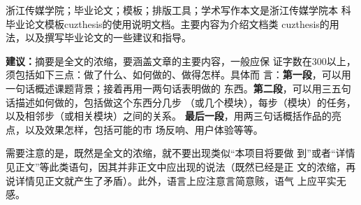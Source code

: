 
\begin{chineseabstract}
	{浙江传媒学院；毕业论文；模板；排版工具；学术写作}本文是浙江传媒学院本
	科毕业论文模板cuzthesis的使用说明文档。主要内容为介绍文档类
	cuzthesis的用法，以及撰写毕业论文的一些建议和指导。

	\begin{leftbar}
		\noindent\textbf{建议：}摘要是全文的浓缩，要涵盖文章的主要内容，一般应保
		证字数在300以上，须包括如下三点：做了什么、如何做的、做得怎样。具体而
		言：\textbf{第一段}，可以用一句话概述课题背景；接着再用一两句话表明做的
		东西。\textbf{第二段}，可以用三五句话描述如何做的，包括做这个东西分几步
		（或几个模块），每步（模块）的任务，以及相邻步（或相关模块）之间的关系。
		\textbf{最后一段}，用两三句话概括作品的亮点，以及效果怎样，包括可能的市
		场反响、用户体验等等。

		\noindent{}需要注意的是，既然是全文的浓缩，就不要出现类似“本项目将要做
		到”或者“详情见正文”等此类语句，因其并非正文中应出现的说法（既然已经是正
		文的浓缩，再说详情见正文就产生了矛盾）。此外，语言上应注意言简意赅，语气
		上应平实无感。
	\end{leftbar}
\end{chineseabstract}

